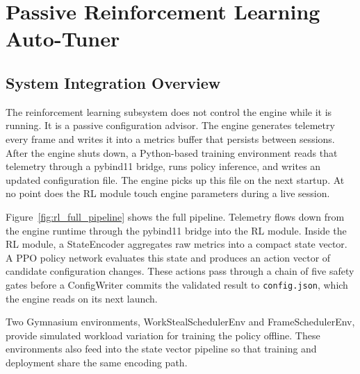 \documentclass[9pt,openany]{extbook}
\begin{document}
\chapter{Passive Reinforcement Learning Auto-Tuner}

\section{System Integration Overview}

The reinforcement learning subsystem does not control the engine while it is running. It is a passive configuration advisor. The engine generates telemetry every frame and writes it into a metrics buffer that persists between sessions. After the engine shuts down, a Python-based training environment reads that telemetry through a pybind11 bridge, runs policy inference, and writes an updated configuration file. The engine picks up this file on the next startup. At no point does the RL module touch engine parameters during a live session.

Figure~\ref{fig:rl_full_pipeline} shows the full pipeline. Telemetry flows down from the engine runtime through the pybind11 bridge into the RL module. Inside the RL module, a StateEncoder aggregates raw metrics into a compact state vector. A PPO policy network evaluates this state and produces an action vector of candidate configuration changes. These actions pass through a chain of five safety gates before a ConfigWriter commits the validated result to \texttt{config.json}, which the engine reads on its next launch.

Two Gymnasium environments, WorkStealSchedulerEnv and FrameSchedulerEnv, provide simulated workload variation for training the policy offline. These environments also feed into the state vector pipeline so that training and deployment share the same encoding path.
\end{document}

